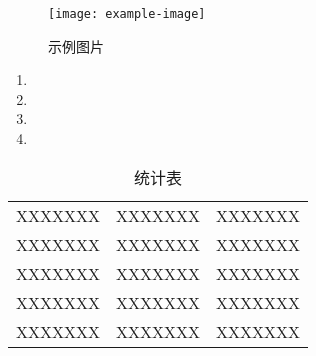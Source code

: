 \documentclass[a4paper,12pt]{article}
\begin{document}
\begin{figure}[H]
    \centering
    \texttt{[image: example-image]}  %
    \caption{示例图片}
    \label{fig:example}
\end{figure}

\begin{enumerate}
  \item 
  \item 
  \item 
  \item  
\end{enumerate}

\setlength{\tabcolsep}{0.5em}
\begin{table}[htbp]
    \centering
    \renewcommand{\arraystretch}{1.5}
    \begin{tabulary}{\textwidth}{|>{\raggedright\arraybackslash}m{0.28\textwidth}|>{\centering\arraybackslash}m{0.12\textwidth}|>{\raggedright\arraybackslash}m{0.5\textwidth}|}
    \hline
     &
     & 
     \\
    \hline
    XXXXXXX & XXXXXXX & XXXXXXX \\
    \hline
    XXXXXXX & XXXXXXX & XXXXXXX \\
    \hline
    XXXXXXX & XXXXXXX & XXXXXXX \\
    \hline
    XXXXXXX & XXXXXXX & XXXXXXX \\
    \hline
    XXXXXXX & XXXXXXX & XXXXXXX \\
    \hline
    \end{tabulary}
    \caption{统计表}
    \label{表1：统计表}
\end{table}
\end{document}
